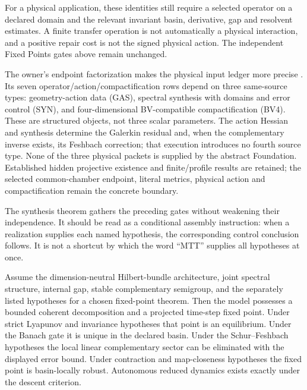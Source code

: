 \documentclass[11pt]{article}
\begin{document}
For a physical application, these identities still require a selected
operator on a declared domain and the relevant invariant basin, derivative,
gap and resolvent estimates. A finite transfer operation is not automatically
a physical interaction, and a positive repair cost is not the signed
physical action. The independent Fixed Points gates above remain unchanged.

\label{sec:consumer-endpoint}
The owner's endpoint factorization makes the physical input ledger more
precise \cite{FrozenEndpoint}. Its seven operator/action/compactification
rows depend on three same-source types: geometry-action data (GAS), spectral
synthesis with domains and error control (SYN), and four-dimensional
BV-compatible compactification (BV4). These are structured objects, not
three scalar parameters. The action Hessian and synthesis determine the
Galerkin residual and, when the complementary inverse exists, its Feshbach
correction; that execution introduces no fourth source type. None of the
three physical packets is supplied by the abstract Foundation. Established
hidden projective existence and finite/profile results are retained; the
selected common-chamber endpoint, literal metrics, physical action and
compactification remain the concrete boundary.

The synthesis theorem gathers the preceding gates without weakening their
independence. It should be read as a conditional assembly instruction: when a
realization supplies each named hypothesis, the corresponding control
conclusion follows. It is not a shortcut by which the word ``MTT'' supplies
all hypotheses at once.

\begin{theorem}\label{thm:foundation}
Assume the dimension-neutral Hilbert-bundle architecture, joint spectral
structure, internal gap, stable complementary semigroup, and the separately
listed hypotheses for a chosen fixed-point theorem. Then the model possesses
a bounded coherent decomposition and a projected time-step fixed point. Under
strict Lyapunov and invariance hypotheses that point is an equilibrium. Under
the Banach gate it is unique in the declared basin. Under the Schur--Feshbach
hypotheses the local linear complementary sector can be eliminated with the
displayed error bound. Under contraction and map-closeness hypotheses the
fixed point is basin-locally robust. Autonomous reduced dynamics exists
exactly under the descent criterion.
\end{theorem}
\end{document}
